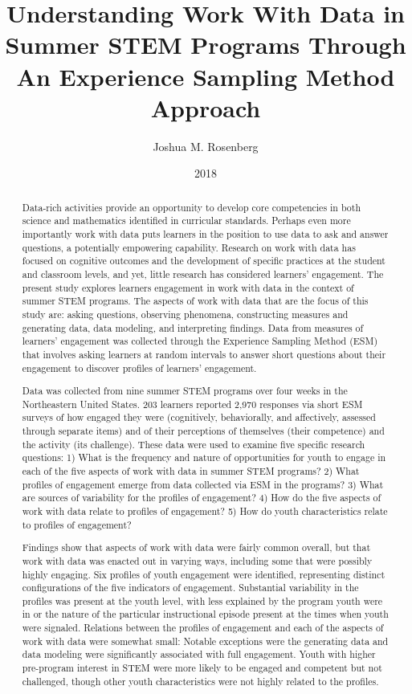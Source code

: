 \documentclass[]{msu-thesis}
\title{Understanding Work With Data in Summer STEM Programs Through An Experience Sampling Method Approach}
\author{Joshua M. Rosenberg}
\date{2018}
\theoremstyle{definition}
\theoremstyle{definition}
\theoremstyle{definition}
\theoremstyle{remark}
\begin{document}

\maketitlepage
\begin{abstract}

Data-rich activities provide an opportunity to develop core competencies in both science and mathematics identified in curricular standards. Perhaps even more importantly work with data puts learners in the position to use data to ask and answer questions, a potentially empowering capability. Research on work with data has focused on cognitive outcomes and the development of specific practices at the student and classroom levels, and yet, little research has considered learners’ engagement. The present study explores learners engagement in work with data in the context of summer STEM programs. The aspects of work with data that are the focus of this study are: asking questions, observing phenomena, constructing measures and generating data, data modeling, and interpreting findings. Data from measures of learners' engagement was collected through the Experience Sampling Method (ESM) that involves asking learners at random intervals to answer short questions about their engagement to discover profiles of learners' engagement.

Data was collected from nine summer STEM programs over four weeks in the Northeastern United States. 203 learners reported 2,970 responses via short ESM surveys of how engaged they were (cognitively, behaviorally, and affectively, assessed through separate items) and of their perceptions of themselves (their competence) and the activity (its challenge).  These data were used to examine five specific research questions: 1) What is the frequency and nature of opportunities for youth to engage in each of the five aspects of work with data in summer STEM programs? 2) What profiles of engagement emerge from data collected via ESM in the programs? 3) What are sources of variability for the profiles of engagement? 4) How do the five aspects of work with data relate to profiles of engagement? 5) How do youth characteristics relate to profiles of engagement?

Findings show that aspects of work with data were fairly common overall, but that work with data was enacted out in varying ways, including some that were possibly highly engaging. Six profiles of youth engagement were identified, representing distinct configurations of the five indicators of engagement. Substantial variability in the profiles was present at the youth level, with less explained by the program youth were in or the nature of the particular instructional episode present at the times when youth were signaled. Relations between the profiles of engagement and each of the aspects of work with data were somewhat small: Notable exceptions were the generating data and data modeling were significantly associated with full engagement. Youth with higher pre-program interest in STEM were more likely to be engaged and competent but not challenged, though other youth characteristics were not highly related to the profiles.


\end{abstract}
\end{document}
